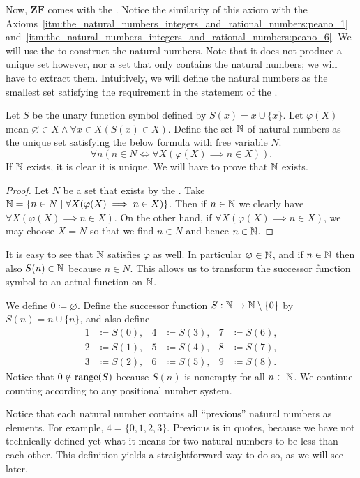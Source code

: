 \documentclass[../main.tex]{subfiles}
\begin{document}
Now, $\mathbf{ZF}$ comes with the . Notice the similarity of this axiom with the Axioms~\ref{itm:the_natural_numbers_integers_and_rational_numbers:peano_1}~and~\ref{itm:the_natural_numbers_integers_and_rational_numbers:peano_6}. We will use the  to construct the natural numbers. Note that it does not produce a unique set however, nor a set that only contains the natural numbers; we will have to extract them. Intuitively, we will define the natural numbers as the smallest set satisfying the requirement in the statement of the .
\begin{definition}\label{dfn:the_natural_numbers_integers_and_rational_numbers:natural_numbers}
    Let $S$ be the unary function symbol defined by $S(x)=x\cup\{x\}$. Let $\varphi(X)$ mean $\varnothing\in X\land\forall x\in X(S(x)\in X)$. Define the set $\mathbb{N}$ of natural numbers as the unique set satisfying the below formula with free variable $N$.
    \begin{equation*}
        \forall n(n\in N\iff\forall X(\varphi(X)\implies n\in X)).
    \end{equation*}
    If $\mathbb{N}$ exists, it is clear it is unique. We will have to prove that $\mathbb{N}$ exists.
\end{definition}
\begin{proof}
    Let $N$ be a set that exists by the . Take $\mathbb{N}=\{n\in N\mid\forall X(\varphi(X)\implies n\in X)\}$. Then if $n\in\mathbb{N}$ we clearly have $\forall X(\varphi(X)\implies n\in X)$. On the other hand, if $\forall X(\varphi(X)\implies n\in X)$, we may choose $X=N$ so that we find $n\in N$ and hence $n\in\mathbb{N}$.
\end{proof}
It is easy to see that $\mathbb{N}$ satisfies $\varphi$ as well. In particular $\varnothing\in\mathbb{N}$, and if $n\in\mathbb{N}$ then also $S(n)\in\mathbb{N}$ because $n\in N$. This allows us to transform the successor function symbol to an actual function on $\mathbb{N}$.
\begin{definition}
    We define $0\coloneq\varnothing$. Define the successor function $S:\mathbb{N}\to\mathbb{N}\setminus\{0\}$ by $S(n)=n\cup\{n\}$, and also define
    \begin{align*}
        1 & \coloneq S(0), & 4 & \coloneq S(3), & 7 & \coloneq S(6), \\
        2 & \coloneq S(1), & 5 & \coloneq S(4), & 8 & \coloneq S(7), \\
        3 & \coloneq S(2), & 6 & \coloneq S(5), & 9 & \coloneq S(8).
    \end{align*}
    Notice that $0\notin\operatorname{range}(S)$ because $S(n)$ is nonempty for all $n\in\mathbb{N}$. We continue counting according to any positional number system.
\end{definition}
Notice that each natural number contains all ``previous'' natural numbers as elements. For example, $4=\{0,1,2,3\}$. Previous is in quotes, because we have not technically defined yet what it means for two natural numbers to be less than each other. This definition yields a straightforward way to do so, as we will see later.
\end{document}
